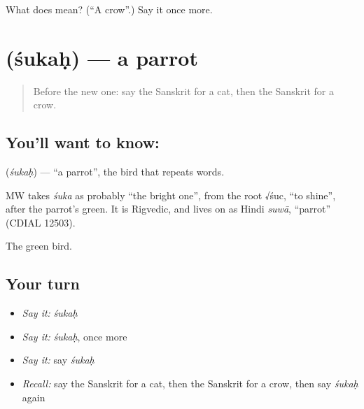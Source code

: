 \begin{tcolorbox}[breakable,colback=teal!4,colframe=teal!35!black,title={Before you move on}]
What does  mean? (\textquotedblleft{}A crow\textquotedblright{}.) Say it once more.
\end{tcolorbox}
\section[\texorpdfstring{\sk{शुकः} (śukaḥ)}{शुकः (śukaḥ)}]{ (śukaḥ) — a parrot}

\label{lesson:SA-C80-parrot}



\begin{quote}
Before the new one: say the Sanskrit for a cat, then the Sanskrit for a crow.
\end{quote}

\subsection*{You'll want to know: }
\textbf{} (\emph{śukaḥ}) — \textquotedblleft{}a parrot\textquotedblright{}, the \textbf{} bird that repeats words.

\begin{cousinweb}
MW takes \emph{śuka} as probably \textquotedblleft{}the bright one\textquotedblright{}, from the root √śuc, \textquotedblleft{}to shine\textquotedblright{}, after the parrot's green. It is Rigvedic, and lives on as Hindi \emph{suwā}, \textquotedblleft{}parrot\textquotedblright{} (CDIAL 12503).
\end{cousinweb}

\begin{grammarlens}[title={What you've built}]
The green bird.
\end{grammarlens}

\subsection*{Your turn}
\begin{itemize}
\raggedright
  \item \emph{Say it:} \emph{śukaḥ}
  \item \emph{Say it:} \emph{śukaḥ}, once more
  \item \emph{Say it:} say \emph{śukaḥ}
  \item \emph{Recall:} say the Sanskrit for a cat, then the Sanskrit for a crow, then say \emph{śukaḥ} again
\end{itemize}

